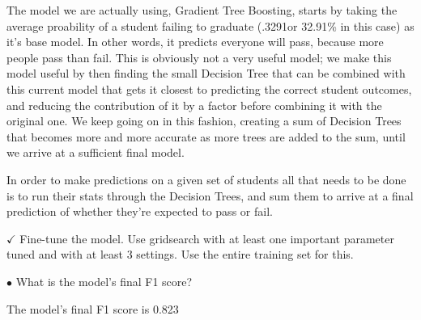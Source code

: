 \documentclass{amsart}
\begin{document}
\begin{list}{}{\addtolength{\parsep}{1mm}}
The model we are actually using, Gradient Tree Boosting, starts by taking the average proability of a student failing to graduate (.3291or 32.91\% in this case) as it's base model.  In other words, it predicts everyone will pass, because more people pass than fail.  This is obviously not a very useful model; we make this model useful by then finding the small Decision Tree that can be combined with this current model that gets it closest to predicting the correct student outcomes, and reducing the contribution of it by a factor before combining it with the original one.  We keep going on in this fashion, creating a sum of Decision Trees that becomes more and more accurate as more trees are added to the sum, until we arrive at a sufficient final model.

In order to make predictions on a given set of students all that needs to be done is to run their stats through the Decision Trees, and sum them to arrive at a final prediction of whether they're
expected to pass or fail.

\item[$\checkmark$] Fine-tune the model.  Use gridsearch with at least one important parameter tuned and with at least 3 settings.  Use the entire training set for this.

\item[$\bullet$] What is the model's final F1 score?

The model's final F1 score is 0.823

\end{list}
\end{document}
